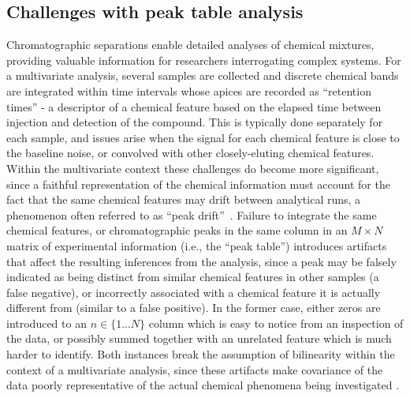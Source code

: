 \documentclass[preprint,12pt]{elsarticle}
\begin{document}
\subsection{Challenges with peak table analysis}
Chromatographic separations enable detailed analyses of chemical mixtures, providing valuable information for researchers interrogating complex systems. For a multivariate analysis, several samples are collected and discrete chemical bands are integrated within time intervals whose apices are recorded as ``retention times'' - a descriptor of a chemical feature based on the elapsed time between injection and detection of the compound. This is typically done separately for each sample, and issues arise when the signal for each chemical feature is close to the baseline noise, or convolved with other closely-eluting chemical features. Within the multivariate context these challenges do become more significant, since a faithful representation of the chemical information must account for the fact that the same chemical features may drift between analytical runs, a phenomenon often referred to as ``peak drift''~\cite{christensen2005chromatographic}. Failure to integrate the same chemical features, or chromatographic peaks in the same column in an $M \times N$ matrix of experimental information (i.e., the ``peak table'') introduces artifacts that affect the resulting inferences from the analysis, since a peak may be falsely indicated as being distinct from similar chemical features in other samples (a false negative), or incorrectly associated with a chemical feature it is actually different from (similar to a false positive). In the former case, either zeros are introduced to an $n \in \{1...N\}$ column which is easy to notice from an inspection of the data, or possibly summed together with an unrelated feature which is much harder to identify. Both instances break the assumption of bilinearity within the context of a multivariate analysis, since these artifacts make covariance of the data poorly representative of the actual chemical phenomena being investigated \cite{armstrong2023parafac2,de2012integration}. 
\end{document}
